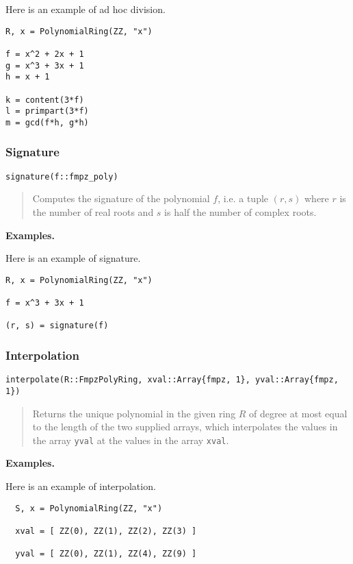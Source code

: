 \documentclass[a4paper,10pt]{article}
\newcommand{\code}{\lstinline}
\newcommand{\desc}[1]{\vspace{-3mm}\begin{quote}#1\end{quote}}
\begin{document}
{{Here is an example of ad hoc division.

\begin{lstlisting}
R, x = PolynomialRing(ZZ, "x")

f = x^2 + 2x + 1
g = x^3 + 3x + 1
h = x + 1

k = content(3*f)
l = primpart(3*f)
m = gcd(f*h, g*h)
\end{lstlisting}

\subsubsection{Signature}

\begin{lstlisting}
signature(f::fmpz_poly)
\end{lstlisting}

\desc{Computes the signature of the polynomial $f$, i.e. a tuple $(r, s)$ where $r$ is
the number of real roots and $s$ is half the number of complex roots.}

\textbf{Examples.}

Here is an example of signature.

\begin{lstlisting}
R, x = PolynomialRing(ZZ, "x")

f = x^3 + 3x + 1

(r, s) = signature(f)
\end{lstlisting}

\subsubsection{Interpolation}

\begin{lstlisting}
interpolate(R::FmpzPolyRing, xval::Array{fmpz, 1}, yval::Array{fmpz, 1})
\end{lstlisting}

\desc{Returns the unique polynomial in the given ring $R$ of degree at most equal to the
length of the two supplied arrays, which interpolates the values in the array \code{yval}
at the values in the array \code{xval}.}

\textbf{Examples.}

Here is an example of interpolation.

\begin{lstlisting}
  S, x = PolynomialRing(ZZ, "x")

  xval = [ ZZ(0), ZZ(1), ZZ(2), ZZ(3) ]

  yval = [ ZZ(0), ZZ(1), ZZ(4), ZZ(9) ] 


\end{lstlisting}}}
\end{document}
